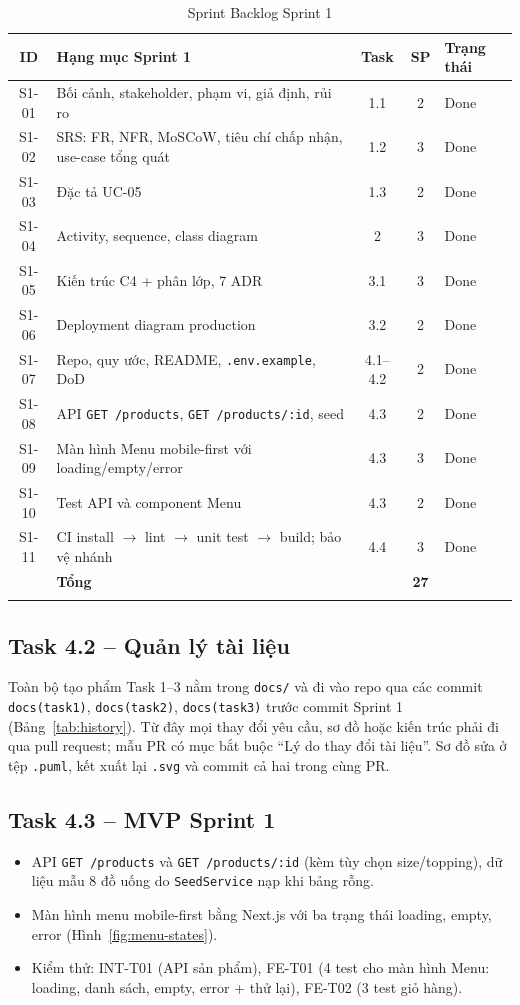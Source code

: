 \documentclass[a4paper]{article}
\newcommand{\st}[1]{\texttt{#1}}
\newcommand{\ra}{\ensuremath{\rightarrow}}
\begin{document}
\begin{longtable}{|c|L{8.2cm}|c|c|L{2.6cm}|}
\hline
\textbf{ID} & \textbf{Hạng mục Sprint 1} & \textbf{Task} & \textbf{SP} & \textbf{Trạng thái} \\ \hline
\endhead
S1-01 & Bối cảnh, stakeholder, phạm vi, giả định, rủi ro & 1.1 & 2 & Done \\ \hline
S1-02 & SRS: FR, NFR, MoSCoW, tiêu chí chấp nhận, use-case tổng quát & 1.2 & 3 & Done \\ \hline
S1-03 & Đặc tả UC-05 & 1.3 & 2 & Done \\ \hline
S1-04 & Activity, sequence, class diagram & 2 & 3 & Done \\ \hline
S1-05 & Kiến trúc C4 + phân lớp, 7 ADR & 3.1 & 3 & Done \\ \hline
S1-06 & Deployment diagram production & 3.2 & 2 & Done \\ \hline
S1-07 & Repo, quy ước, README, \st{.env.example}, DoD & 4.1--4.2 & 2 & Done \\ \hline
S1-08 & API \st{GET /products}, \st{GET /products/:id}, seed & 4.3 & 2 & Done \\ \hline
S1-09 & Màn hình Menu mobile-first với loading/empty/error & 4.3 & 3 & Done \\ \hline
S1-10 & Test API và component Menu & 4.3 & 2 & Done \\ \hline
S1-11 & CI install \ra{} lint \ra{} unit test \ra{} build; bảo vệ nhánh & 4.4 & 3 & Done \\ \hline
& \textbf{Tổng} & & \textbf{27} & \\ \hline
\caption{Sprint Backlog Sprint 1}
\end{longtable}

\subsection{Task 4.2 -- Quản lý tài liệu}
Toàn bộ tạo phẩm Task 1--3 nằm trong \st{docs/} và đi vào repo qua các commit \st{docs(task1)}, \st{docs(task2)}, \st{docs(task3)} trước commit Sprint 1 (Bảng~\ref{tab:history}). Từ đây mọi thay đổi yêu cầu, sơ đồ hoặc kiến trúc phải đi qua pull request; mẫu PR có mục bắt buộc ``Lý do thay đổi tài liệu''. Sơ đồ sửa ở tệp \st{.puml}, kết xuất lại \st{.svg} và commit cả hai trong cùng PR.

\subsection{Task 4.3 -- MVP Sprint 1}
\begin{itemize}
  \item API \st{GET /products} và \st{GET /products/:id} (kèm tùy chọn size/topping), dữ liệu mẫu 8 đồ uống do \st{SeedService} nạp khi bảng rỗng.
  \item Màn hình menu mobile-first bằng Next.js với ba trạng thái loading, empty, error (Hình~\ref{fig:menu-states}).
  \item Kiểm thử: INT-T01 (API sản phẩm), FE-T01 (4 test cho màn hình Menu: loading, danh sách, empty, error + thử lại), FE-T02 (3 test giỏ hàng).
\end{itemize}
\end{document}
